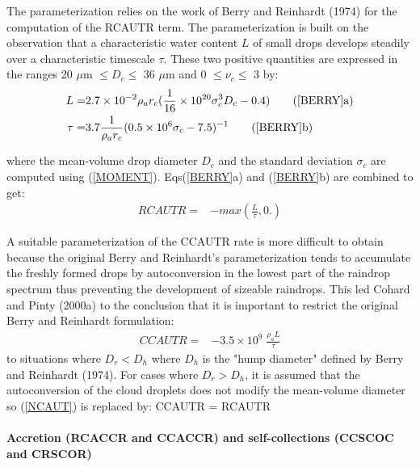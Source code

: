 The parameterization relies on the work of Berry and Reinhardt (1974) for 
the computation of the RCAUTR term. The parameterization is built on the 
observation that a characteristic water content $L$ of small drops develops 
steadily over a characteristic timescale $\tau$. These two positive 
quantities are expressed in the ranges 20 $\mu$m $\leq D_c \leq$ 36 $\mu$m 
and 0 $\leq \nu_c \leq$ 3 by:
%
\begin{subequations} \label{BERRY}
\begin{align}
L=&2.7 \times 10^{-2}\rho_a r_c
(\dfrac{1}{16}\times 10^{20}\sigma_c^3D_c-0.4) \tag{\ref{BERRY}a}\\
\tau=& 3.7\frac{\displaystyle{1}}{\displaystyle{\rho_a r_c}}
(0.5 \times 10^6\sigma_c-7.5)^{-1} \tag{\ref{BERRY}b}
\end{align}
\end{subequations}
\addtocounter{equation}{1}
%
\noindent where the mean-volume drop diameter $D_c$ and the standard 
deviation $\sigma_c$ are computed using (\ref{MOMENT}). Eqs({\ref{BERRY}a})
and ({\ref{BERRY}b}) are combined to get: 
%
\begin{align}
\label{RCAUT}
RCAUTR = & - max(\frac{\displaystyle{L}}{\displaystyle{\tau}},0.)
\end{align}
%

A suitable parameterization of the CCAUTR rate is more difficult to obtain
because the original Berry and Reinhardt's parameterization tends to 
accumulate the freshly formed drops by autoconversion in the lowest
part of the raindrop spectrum thus preventing the development of sizeable
raindrops. This led Cohard and Pinty (2000a) to the conclusion that it is 
important to restrict the original Berry and Reinhardt formulation:
%
\begin{align}
\label{NCAUT}
CCAUTR = & -3.5 \times 10^9 \;\frac{\displaystyle{\rho_a L}}{\displaystyle{\tau}}
\end{align}
%
\noindent to situations where $D_r<D_h$ where $D_h$ is the "hump diameter"
defined by Berry and Reinhardt (1974). For cases where $D_r>D_h$, it is
assumed that the autoconversion of the cloud droplets does not modify the 
mean-volume diameter so (\ref{NCAUT}) is replaced by:
%
\beq\label{NCCAUTR}
CCAUTR =  RCAUTR
\eeq
%

\paragraph{Accretion (RCACCR and CCACCR) and self-collections (CCSCOC 
and CRSCOR)}

